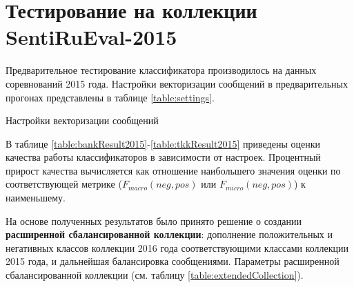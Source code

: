 \section{Тестирование на коллекции SentiRuEval-2015}
\label{sec:test2015}
%
%
Предварительное тестирование классификатора производилось на данных
соревнований 2015 года.
Настройки векторизации сообщений в предварительных прогонах представлены в
таблице \ref{table:settings}.

\begin{table}[ht!]
\centering
\caption{Настройки векторизации сообщений}
\label{table:settings}
\end{table}


В таблице \ref{table:bankResult2015}-\ref{table:tkkResult2015} приведены оценки
качества работы классификаторов в зависимости от настроек.
Процентный прирост качества вычисляется как отношение наибольшего значения оценки по
соответствующей метрике ($F_{macro}(neg, pos)$ или $F_{micro}(neg, pos)$) к
наименьшему.





%
%
На основе полученных результатов было принято решение о создании {\bf расширенной
сбалансированной коллекции}: дополнение положительных и негативных классов
коллекции 2016 года соответствующими классами коллекции 2015 года, и дальнейшая
балансировка сообщениями.
Параметры расширенной сбалансированной коллекции (см. таблицу
\ref{table:extendedCollection}).


